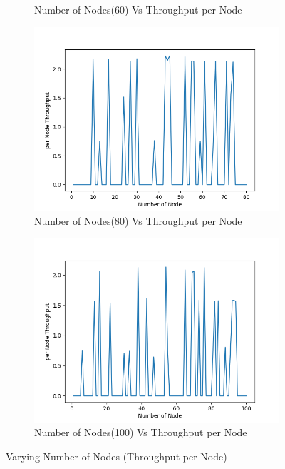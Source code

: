 \begin{figure}[h]
\begin{subfigure}{.5\textwidth}
         \caption{Number of Nodes(60) Vs Throughput per Node}
        \end{subfigure}
\begin{subfigure}{.5\textwidth}
    \centering
    \includegraphics[width=.8\linewidth]{_15_4_static/NumberofNode(80)vsperNodeThroughput.png}
         \caption{Number of Nodes(80) Vs Throughput per Node}
        \end{subfigure}
\begin{subfigure}{.5\textwidth}
    \centering
    \includegraphics[width=.8\linewidth]{_15_4_static/NumberofNode(100)vsperNodeThroughput.png}
         \caption{Number of Nodes(100) Vs Throughput per Node}
        \end{subfigure}
\caption{Varying Number of Nodes (Throughput per Node)}
\label{node_per_node_throughput}
\end{figure}

